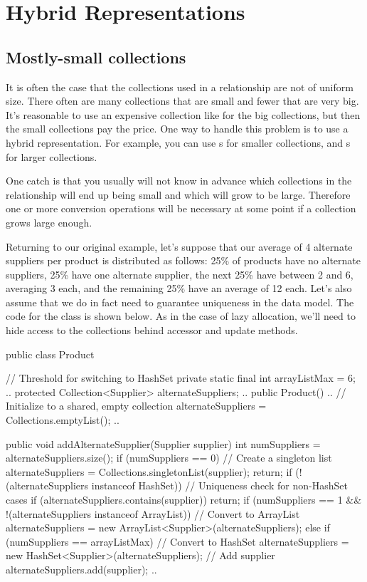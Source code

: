 \section{Hybrid Representations}
\subsection{Mostly-small collections}
It is often the case that the collections used in a relationship
are not of uniform size. There often are many collections that are small and fewer that are
very big.  It's reasonable to use an expensive collection like 
for the big collections, but then the small collections pay the price. One way
to handle this problem is to use a hybrid representation. For example, you can
use s for smaller collections, and s for larger
collections. 

One catch is that you usually will not know in advance which collections in the
relationship will end up being small and which will grow to be large. Therefore
one or more conversion operations will be necessary at some point if a
collection grows large enough. 

Returning to our original example, let's suppose that our average of 4 alternate
suppliers per product is distributed as follows: 25\% of products have no
alternate suppliers, 25\% have one alternate supplier, the next 25\% have
between 2 and 6, averaging 3 each, and the remaining 25\% have an
average of 12 each.
Let's also assume that we do in fact need to guarantee uniqueness in the data
model. The code for the  class is shown below. As in the case of
lazy allocation, we'll need to hide access to the collections behind
accessor and update methods. 

\begin{shortlisting} 
public class Product {

	// Threshold for switching to HashSet
	private static final int arrayListMax = 6;
	.. 
	protected Collection<Supplier> alternateSuppliers;
	..
	public Product() {
		..
		// Initialize to a shared, empty collection
		alternateSuppliers = Collections.emptyList();
		..
	}
	
	public void addAlternateSupplier(Supplier supplier) {
		int numSuppliers = alternateSuppliers.size();
		if (numSuppliers == 0) {
			// Create a singleton list
			alternateSuppliers = 
				Collections.singletonList(supplier);
			return;
		}
		if (!(alternateSuppliers instanceof HashSet)) {
			// Uniqueness check for non-HashSet cases
			if (alternateSuppliers.contains(supplier)) {
				return;
			}
			if (numSuppliers == 1 && 
			 	!(alternateSuppliers instanceof ArrayList)) {
			 	// Convert to ArrayList
			 	alternateSuppliers = 
			 		new ArrayList<Supplier>(alternateSuppliers);
			}
			else if (numSuppliers == arrayListMax) {
				// Convert to HashSet
			 	alternateSuppliers = 
			 		new HashSet<Supplier>(alternateSuppliers);
			}
		}
		// Add supplier
		alternateSuppliers.add(supplier);
	}
	..
}
\end{shortlisting}

